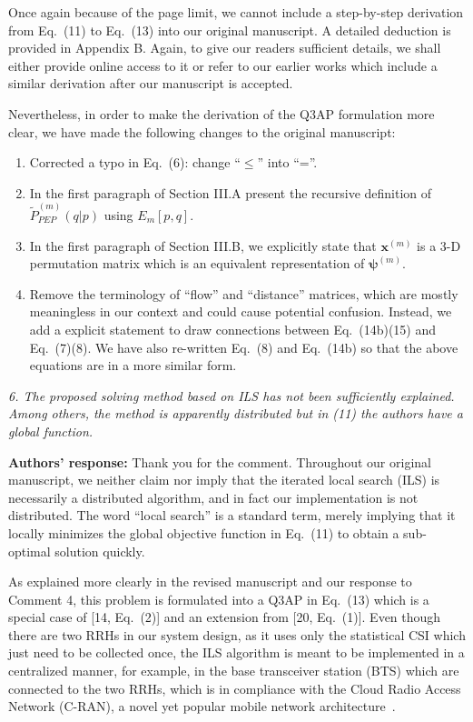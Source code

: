 \documentclass[onecolumn, 11pt, draftclsnofoot]{IEEEtran}
\begin{document}
Once again because of the page limit, we cannot include a step-by-step
derivation from Eq.~(11) to Eq.~(13) into our original manuscript. A detailed
deduction is provided in Appendix B. Again, to give our readers sufficient
details, we shall either provide online access to it or refer to our earlier
works which include a similar derivation after our manuscript is accepted.

Nevertheless, in order to make the derivation of the Q3AP formulation more
clear, we have made the following changes to the original manuscript:
\begin{enumerate}
  \item Corrected a typo in Eq.~(6): change ``$\leq$'' into ``=''.
  \item In the first paragraph of Section III.A present the recursive definition
  of $\tilde{P}_{PEP}^{(m)}(q|p)$ using $E_m[p,q]$.
  \item In the first paragraph of Section III.B, we explicitly state that
  $\mathbf{x}^{(m)}$ is a 3-D permutation matrix which is an equivalent
  representation of $\bm{\psi}^{(m)}$.
  \item Remove the terminology of ``flow'' and ``distance'' matrices, which are
  mostly meaningless in our context and could cause potential confusion.
  Instead, we add a explicit statement to draw connections between Eq.~(14b)(15)
  and Eq.~(7)(8). We have also re-written Eq.~(8) and Eq.~(14b) so that the
  above equations are in a more similar form.
\end{enumerate}

\vspace{0.5cm}

\noindent
\emph{6. The proposed solving method based on ILS has not been sufficiently
explained. Among others, the method is apparently distributed but in (11) the
authors have a global function.}

\noindent \textbf{Authors' response:}
Thank you for the comment. Throughout our original manuscript, we neither claim
nor imply that the iterated local search (ILS) is necessarily a distributed
algorithm, and in fact our implementation is not distributed. The word ``local search''
is a standard term, merely implying that it 
locally minimizes the global objective function in
Eq.~(11) to obtain a sub-optimal solution quickly. 

As explained more clearly in the revised manuscript and our response
to Comment 4, this problem is formulated into a Q3AP in Eq.~(13) which is a
special case of [14, Eq.~(2)] and an extension from [20, Eq.~(1)]. Even though
there are two RRHs in our system design, as it uses only the statistical CSI
which just need to be collected once, the ILS algorithm is meant to be
implemented in a centralized manner, for example, in the base transceiver
station (BTS) which are connected to the two RRHs, which is in compliance with
the Cloud Radio Access Network (C-RAN), a novel yet popular mobile network
architecture~\citep[R][]{6897914}.
\end{document}
